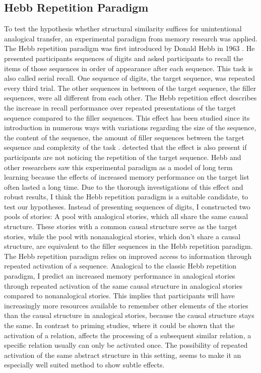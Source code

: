 \documentclass[a4paper,man,natbib,floatsintext,import]{apa6}
\begin{document}
\subsection{Hebb Repetition Paradigm}
To test the hypothesis whether structural similarity suffices for unintentional analogical transfer, an experimental paradigm from memory research was applied. The Hebb repetition paradigm was first introduced by Donald Hebb in 1963 \citep{Lafond2010}. He presented participants sequences of digits and asked participants to recall the items of those sequences in order of appearance after each sequence. This task is also called serial recall. One sequence of digits, the target sequence, was repeated every third trial. The other sequences in between of the target sequence, the filler sequences, were all different from each other. The Hebb repetition effect describes the increase in recall performance over repeated presentations of the target sequence compared to the filler sequences. This effect has been studied since its introduction in numerous ways with variations regarding the size of the sequence, the content of the sequence, the amount of filler sequences between the target sequence and complexity of the task \citep{Lafond2010,Oberauer2015}. \cite{McKelvie1987} detected that the effect is also present if participants are not noticing the repetition of the target sequence.
Hebb and other researchers saw this experimental paradigm as a model of long term learning because the effects of increased memory performance on the target list often lasted a long time. Due to the thorough investigations of this effect and robust results, I think the Hebb repetition paradigm is a suitable candidate, to test our hypotheses. Instead of presenting sequences of digits, I constructed two pools of stories: A pool with analogical stories, which all share the same causal structure. These stories with a common causal structure serve as the target stories, while the pool with nonanalogical stories, which don't share a causal structure, are equivalent to the filler sequences in the Hebb repetition paradigm. The Hebb repetition paradigm relies on improved access to information through repeated activation of a sequence. Analogical to the classic Hebb repetition paradigm, I predict an increased memory performance in analogical stories through repeated activation of the same causal structure in analogical stories compared to nonanalogical stories. This implies that participants will have increasingly more resources available to remember other elements of the stories than the causal structure in analogical stories, because the causal structure stays the same. In contrast to priming studies, where it could be shown that the activation of a relation, affects the processing of a subsequent similar relation, a specific relation usually can only be activated once. The possibility of repeated activation of the same abstract structure in this setting, seems to make it an especially well suited method to show subtle effects.
\end{document}
